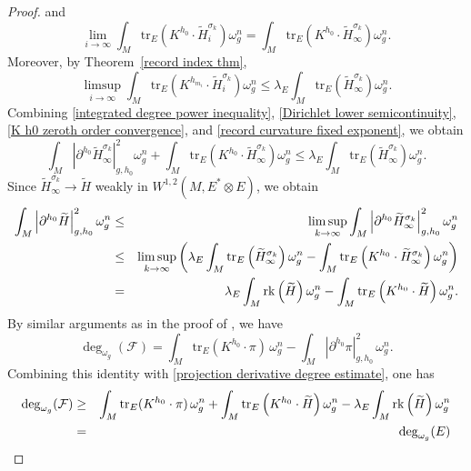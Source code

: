 \documentclass[12pt, reqno]{amsart}
\newcommand\cF{{\mathcal F}}
\newcommand{\rk}{{\rm rk}}
\theoremstyle{plain}
\theoremstyle{definition}
\newcommand{\beq}{\begin{equation}}
\newcommand{\eeq}{\end{equation}}
\renewcommand{\tilde}{\widetilde}
\newcommand{\ts}{\otimes}
\renewcommand{\>}{\rightarrow}
\newcommand{\om}{\omega}
\newcommand{\tr}{\mathrm{tr}}
\numberwithin{equation}{section}
\begin{document}
\begin{proof}
 and
	\begin{equation}
	\lim_{i\to\infty}\int_M\tr_E\left(K^{h_0}\cdot\tilde H_i^{\sigma_k}\right)\omega_g^n
	=
	\int_M\tr_E\left(K^{h_0}\cdot \tilde H_\infty^{\sigma_k}\right)\omega_g^n.
	\label{K h0 zeroth order convergence}
	\end{equation}
	Moreover, by Theorem~\ref{record index thm},
	\begin{equation}
	\limsup_{i\to\infty}
	\int_M\tr_E\left(K^{h_{m_i}}\cdot\tilde H_i^{\sigma_k}\right)\omega_g^n
	\leq
	\lambda_E\int_M\tr_E\left(\tilde H_\infty^{\sigma_k}\right)\omega_g^n.
	\label{record curvature fixed exponent}
	\end{equation}
	Combining \eqref{integrated degree power inequality},
	\eqref{Dirichlet lower semicontinuity},
	\eqref{K h0 zeroth order convergence}, and
	\eqref{record curvature fixed exponent}, we obtain
	\beq
	\int_M\left|\partial^{h_0}\tilde H_\infty^{\sigma_k}\right|_{g,h_0}^2
	\omega_g^n
	+\int_M\tr_E\left(K^{h_0}\cdot \tilde H_\infty^{\sigma_k}\right)\omega_g^n
	\leq
	\lambda_E\int_M\tr_E\left(\tilde H_\infty^{\sigma_k}\right)\omega_g^n.
	\label{fixed exponent degree inequality}
	\eeq
 Since $\tilde H_\infty^{\sigma_k}\to \tilde H$ weakly in $W^{1,2}(M,E^*\ts E)$, we obtain
	\begin{eqnarray}
	\int_M\left|\partial^{h_0}\tilde H\right|_{g,h_0}^2\omega_g^n
	&\leq& \limsup_{k\to\infty}\int_M\left|\partial^{h_0}\tilde H_\infty^{\sigma_k}\right|_{g,h_0}^2\omega_g^n\nonumber\\
	&\leq& \limsup_{k\to\infty}\left( \lambda_E\int_M\tr_E\left(\tilde H_\infty^{\sigma_k}\right)\omega_g^n - \int_M\tr_E\left(K^{h_0}\cdot \tilde H_\infty^{\sigma_k}\right)\omega_g^n\right)\nonumber\\
	&=&  \lambda_E\int_M \rk\left(\tilde H\right)\om_g^n -\int_M \tr_E\left(K^{h_0}\cdot \tilde H\right)\omega_g^n.
	\label{projection derivative degree estimate}
	\end{eqnarray}
	By  similar arguments as in the proof of
	\cite[Theorem~1.1]{XYY26b+}, we have
	\[
	\deg_{\omega_g}(\cF)
	=\int_M\tr_E(K^{h_0}\cdot\pi)\,\omega_g^n
	-\int_M|\partial^{h_0}\pi|_{g,h_0}^2\,\omega_g^n.
	\]
	Combining this identity with \eqref{projection derivative degree estimate}, one has
	\begin{eqnarray}
	\deg_{\omega_g}(\cF)
	&\geq&
	\int_M\tr_E(K^{h_0}\cdot\pi)\,\omega_g^n
	+\int_M \tr_E\left(K^{h_0}\cdot \tilde H\right)\omega_g^n-\lambda_E\int_M \rk\left(\tilde H\right)\om_g^n
	\nonumber\\
	&=&\deg_{\omega_g}(E)

\end{eqnarray}
\end{proof}
\end{document}

